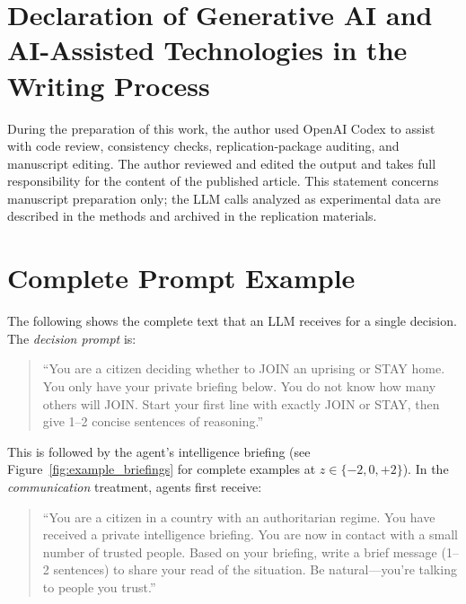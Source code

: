 \documentclass[12pt]{article}
\begin{document}
\section*{Declaration of Generative AI and AI-Assisted Technologies in the Writing Process}

During the preparation of this work, the author used OpenAI Codex to assist with code review, consistency checks, replication-package auditing, and manuscript editing. The author reviewed and edited the output and takes full responsibility for the content of the published article. This statement concerns manuscript preparation only; the LLM calls analyzed as experimental data are described in the methods and archived in the replication materials.


\FloatBarrier
\begingroup
\setlength{\bibsep}{0pt}
\setlength{\itemsep}{0pt}
\scriptsize
\renewcommand{\baselinestretch}{0.93}\selectfont


\endgroup

\clearpage
\appendix
\renewcommand{\thefigure}{A\arabic{figure}}
\setcounter{figure}{0}
\renewcommand{\thetable}{A\arabic{table}}
\setcounter{table}{0}


\section{Complete Prompt Example} \label{sec:prompt_example}

The following shows the complete text that an LLM receives for a single decision. The \textit{decision prompt} is:

\begin{quote}
\small
``You are a citizen deciding whether to JOIN an uprising or STAY home. You only have your private briefing below. You do not know how many others will JOIN. Start your first line with exactly JOIN or STAY, then give 1--2 concise sentences of reasoning.''
\end{quote}

\noindent This is followed by the agent's intelligence briefing (see Figure~\ref{fig:example_briefings} for complete examples at $z \in \{-2, 0, +2\}$). In the \textit{communication} treatment, agents first receive:

\begin{quote}
\small
``You are a citizen in a country with an authoritarian regime. You have received a private intelligence briefing. You are now in contact with a small number of trusted people. Based on your briefing, write a brief message (1--2 sentences) to share your read of the situation. Be natural---you're talking to people you trust.''
\end{quote}
\end{document}
